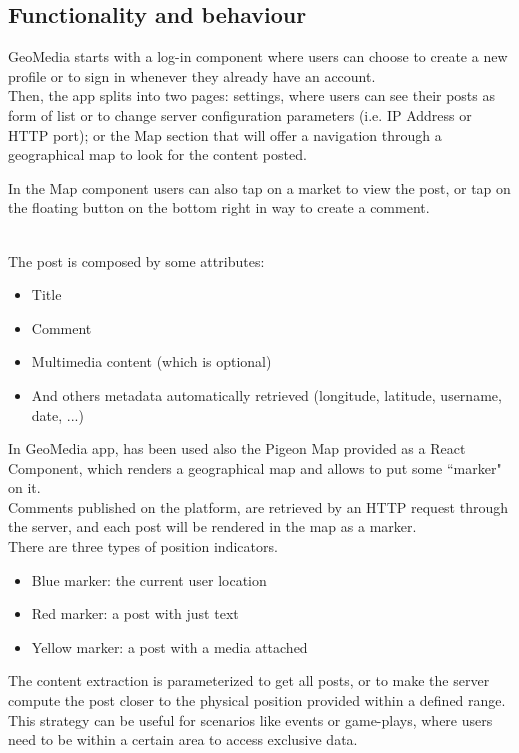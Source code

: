 \documentclass[conference]{IEEEtran}
\begin{document}
\subsection{Functionality and behaviour}

GeoMedia starts with a log-in component where users can choose to create a new profile or to sign in whenever they already have an account.
\\
Then, the app splits into two pages: settings, where users can see their posts as form of list or to change server configuration parameters (i.e. IP Address or HTTP port); or the Map section that will offer a navigation through a geographical map to look for the content posted.


In the Map component users can also tap on a market to view the post, or tap on the floating button on the bottom right in way to create a comment.


\\The post is composed by some attributes:
\begin{itemize}
    \item Title
    \item Comment
    \item Multimedia content (which is optional)
    \item And others metadata automatically retrieved (longitude, latitude, username, date, ...)
\end{itemize}

In GeoMedia app, has been used also the Pigeon Map\cite{b8} provided as a React Component, which renders a geographical map and allows to put some ``marker" on it.
\\
Comments published on the platform, are retrieved by an HTTP request through the server, and each post will be rendered in the map as a marker.
\\There are three types of position indicators.
\begin{itemize}
\item Blue marker: the current user location
\item Red marker: a post with just text
\item Yellow marker: a post with a media attached 
\end{itemize}

The content extraction is parameterized to get all posts, or to make the server compute the post closer to the physical position provided within a defined range.
This strategy can be useful for scenarios like events or game-plays, where users need to be  within a certain area to access exclusive data.
\end{document}
